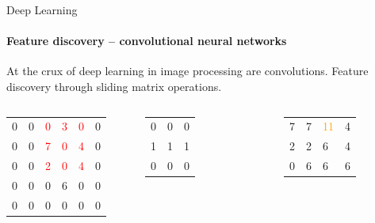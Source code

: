 \documentclass{beamer}
\begin{document}
\begin{darkframes}
    \begin{frame}{Deep Learning}
      \framesubtitle{Feature discovery -- convolutional neural networks}
      \begin{block}
      {\small{At the crux of deep learning in image processing are convolutions.}}
      Feature discovery through sliding matrix operations. 
      \end{block}

      \begin{columns}[onlytextwidth]
            \begin{table}[]
            \begin{tabular}{llllll}
            0 & 0 & \textcolor{red}{0} & \textcolor{red}{3} & \textcolor{red}{0} & 0 \\
            0 & 0 & \textcolor{red}{7} & \textcolor{red}{0} & \textcolor{red}{4} & 0 \\
            0 & 0 & \textcolor{red}{2} & \textcolor{red}{0} & \textcolor{red}{4} & 0 \\
            0 & 0 & 0 & 6 & 0 & 0 \\
            0 & 0 & 0 & 0 & 0 & 0
            \end{tabular}
            \end{table}
            \begin{table}[]
            \begin{tabular}{lll}
            0 & 0 & 0 \\
            1 & 1 & 1 \\
            0 & 0 & 0
            \end{tabular}
            \end{table}
            \begin{table}[]
            \begin{tabular}{llll}
            7 & 7 & \textcolor{orange}{11} & 4 \\
            2 & 2 & 6 & 4 \\
            0 & 6 & 6 & 6 
            \end{tabular}
            \end{table}
      \end{columns}
        
    \end{frame}
    

\end{darkframes}
\end{document}
